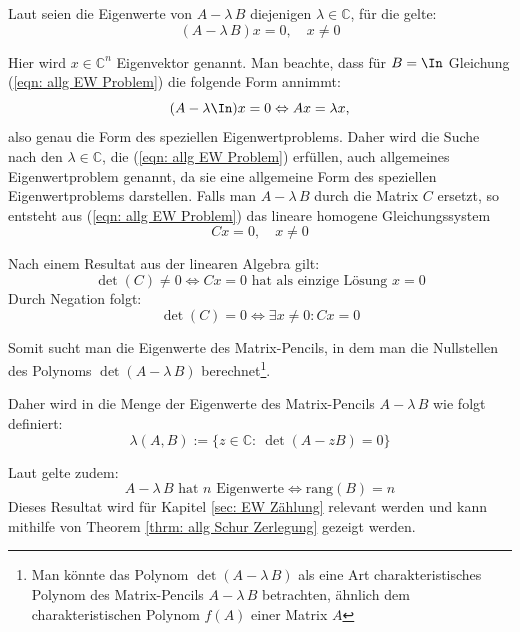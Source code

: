 \documentclass[a4paper,12pt]{report}
\newcommand{\C}{\mathbb C}
\newcommand{\zitat}[1]{\glqq #1\grqq}
\newcommand{\rang}{\text{rang}}
\newcommand{\AlamB}{A-\lambda\,B}
\newcommand{\1}{\mathds{1}}
\theoremstyle{plain} %
\theoremstyle{definition} %
\theoremstyle{remark}
\begin{document}
            Laut \cite[S. 375]{matrixGolub} seien die Eigenwerte von $\AlamB$ diejenigen $\lambda \in\C$, für die gelte:
            \begin{equation}
                  \label{eqn: allg EW Problem}
                  (\AlamB)x=0,\quad x\ne 0
            \end{equation}
            
            Hier wird $x\in\C^n$ Eigenvektor genannt.
            Man beachte, dass für $B=\In$ Gleichung (\ref{eqn: allg EW Problem}) die folgende Form annimmt:
            $$(A-\lambda\In)x=0 \Leftrightarrow Ax = \lambda x,$$
            also genau die Form des speziellen Eigenwertproblems.
            Daher wird die Suche nach den $\lambda\in\C$, die (\ref{eqn: allg EW Problem}) erfüllen, auch \zitat{allgemeines Eigenwertproblem}\cite[S. 380]{maschinendynamikDresig} genannt, da sie eine allgemeine Form des speziellen Eigenwertproblems darstellen.
            Falls man $\AlamB$ durch die Matrix $C$ ersetzt, so entsteht aus (\ref{eqn: allg EW Problem}) das lineare homogene Gleichungssystem
            $$Cx=0,\quad x\ne 0$$

            Nach einem Resultat aus der linearen Algebra gilt:
            $$\det(C)\ne 0 \Leftrightarrow Cx=0 \text{ hat als einzige Lösung }x=0$$
            Durch Negation folgt:
            $$\det(C)=0 \Leftrightarrow \exists x\ne 0: Cx=0$$

            Somit sucht man die Eigenwerte des Matrix-Pencils, in dem man die Nullstellen des Polynoms $\det(\AlamB)$ berechnet\footnote{Man könnte das Polynom $\det(\AlamB)$ als eine Art charakteristisches Polynom des Matrix-Pencils $\AlamB$ betrachten, ähnlich dem charakteristischen Polynom $f(A)$ einer Matrix $A$}.
            
            Daher wird in \cite[S. 375]{matrixGolub} die Menge der Eigenwerte des Matrix-Pencils $\AlamB$ wie folgt definiert:
            \begin{equation}
                  \label{def: EW Pencil}
                  \lambda(A,B):=\{z\in\C:\ \det(A - zB) = 0\}
            \end{equation}

            Laut \cite[S. 375]{matrixGolub} gelte zudem:
            \begin{equation}
                  \label{eqn: n EW äquiv rang B n}
                  \AlamB \text{ hat }n\text{ Eigenwerte}\Leftrightarrow \rang(B)=n
            \end{equation}
            Dieses Resultat wird für Kapitel \ref{sec: EW Zählung} relevant werden und kann mithilfe von Theorem \ref{thrm: allg Schur Zerlegung} gezeigt werden.
\end{document}
